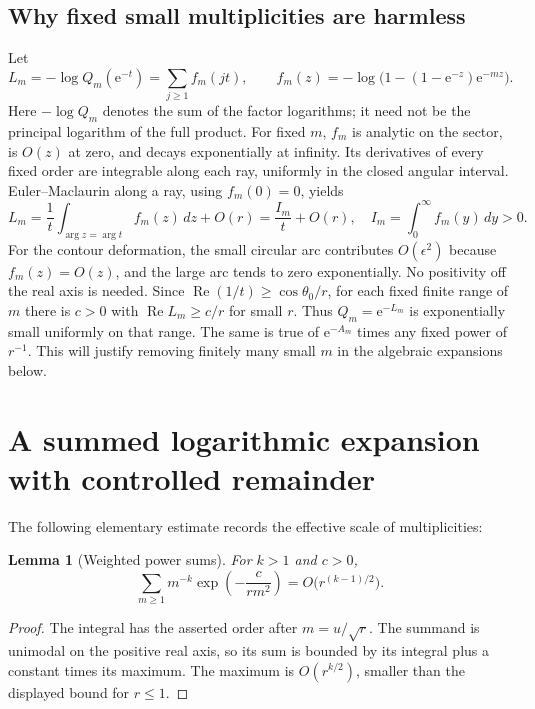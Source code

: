 \documentclass[11pt,letterpaper]{article}
\numberwithin{equation}{section}
\newtheorem{lemma}[theorem]{Lemma}
\theoremstyle{definition}\newtheorem{definition}[theorem]{Definition}
\theoremstyle{remark}\newtheorem{remark}[theorem]{Remark}
\newcommand{\ee}{\mathrm e}
\DeclareMathOperator{\Rea}{Re}
\begin{document}
\subsection{Why fixed small multiplicities are harmless}
Let
\begin{equation}\label{dmv:cnt:eq:L}
L_m=-\log Q_m(\ee^{-t})=\sum_{j\ge1}f_m(jt),\qquad
f_m(z)=-\log\bigl(1-(1-\ee^{-z})\ee^{-mz}\bigr).
\end{equation}
Here $-\log Q_m$ denotes the sum of the factor logarithms; it need not be the principal logarithm of the full product. For fixed $m$, $f_m$ is analytic on the sector, is $O(z)$ at zero, and decays exponentially at infinity. Its derivatives of every fixed order are integrable along each ray, uniformly in the closed angular interval. Euler--Maclaurin along a ray, using $f_m(0)=0$, yields
\begin{equation}\label{dmv:cnt:eq:smallm}
L_m=\frac1t\int_{\arg z=\arg t}f_m(z)\,dz+O(r)=\frac{I_m}{t}+O(r),
\quad I_m=\int_0^\infty f_m(y)\,dy>0.
\end{equation}
For the contour deformation, the small circular arc contributes $O(\epsilon^2)$ because $f_m(z)=O(z)$, and the large arc tends to zero exponentially. No positivity off the real axis is needed. Since $\Rea(1/t)\ge\cos\theta_0/r$, for each fixed finite range of $m$ there is $c>0$ with $\Rea L_m\ge c/r$ for small $r$. Thus $Q_m=\ee^{-L_m}$ is exponentially small uniformly on that range. The same is true of $\ee^{-A_m}$ times any fixed power of $r^{-1}$. This will justify removing finitely many small $m$ in the algebraic expansions below.

\section{A summed logarithmic expansion with controlled remainder}\label{dmv:cnt:sec:sum}
The following elementary estimate records the effective scale of multiplicities:
\begin{lemma}[Weighted power sums]\label{dmv:cnt:lem:powersum}
For $k>1$ and $c>0$,
\begin{equation}\label{dmv:cnt:eq:powerweight}
\sum_{m\ge1}m^{-k}\exp\left(-\frac{c}{rm^2}\right)
=O\bigl(r^{(k-1)/2}\bigr).
\end{equation}
\end{lemma}
\begin{proof}
The integral has the asserted order after $m=u/\sqrt r$. The summand is unimodal on the positive real axis, so its sum is bounded by its integral plus a constant times its maximum. The maximum is $O(r^{k/2})$, smaller than the displayed bound for $r\le1$.
\end{proof}
\end{document}
